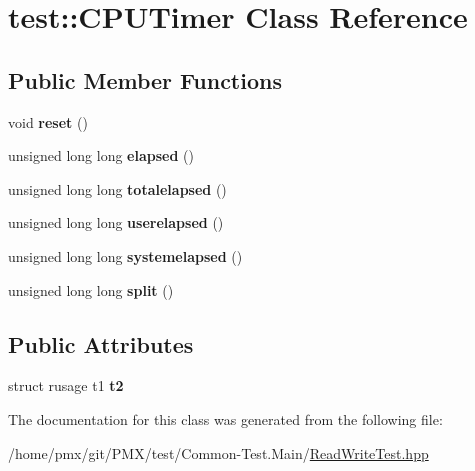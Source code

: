 \hypertarget{classtest_1_1CPUTimer}{}\section{test\+:\+:C\+P\+U\+Timer Class Reference}
\label{classtest_1_1CPUTimer}
\subsection*{Public Member Functions}
\begin{DoxyCompactItemize}
\item 
\mbox{\label{classtest_1_1CPUTimer_aac444ae6ffb90ab4d8c586ff792e48a5}} 
void {\bfseries reset} ()
\item 
\mbox{\label{classtest_1_1CPUTimer_acb2f9a6a10d96223dc8d9484e8b44402}} 
unsigned long long {\bfseries elapsed} ()
\item 
\mbox{\label{classtest_1_1CPUTimer_af0ed07746c7c4b136863761887b110bc}} 
unsigned long long {\bfseries totalelapsed} ()
\item 
\mbox{\label{classtest_1_1CPUTimer_a4266c97c324ccb123868ca5905fd6aa5}} 
unsigned long long {\bfseries userelapsed} ()
\item 
\mbox{\label{classtest_1_1CPUTimer_acc654ea085c8c5a36f0dae333f4f577f}} 
unsigned long long {\bfseries systemelapsed} ()
\item 
\mbox{\label{classtest_1_1CPUTimer_a6ebf6c77672976953e9de4717cc01c91}} 
unsigned long long {\bfseries split} ()
\end{DoxyCompactItemize}
\subsection*{Public Attributes}
\begin{DoxyCompactItemize}
\item 
\mbox{\label{classtest_1_1CPUTimer_a2ba8b25465ef34477a6e0a29c526a2e5}} 
struct rusage t1 {\bfseries t2}
\end{DoxyCompactItemize}


The documentation for this class was generated from the following file\+:\begin{DoxyCompactItemize}
\item 
/home/pmx/git/\+P\+M\+X/test/\+Common-\/\+Test.\+Main/\hyperlink{ReadWriteTest_8hpp}{Read\+Write\+Test.\+hpp}\end{DoxyCompactItemize}

